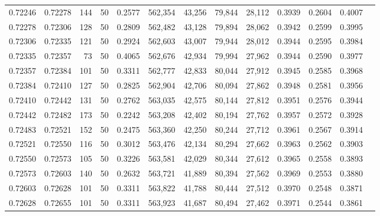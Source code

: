 \begin{tabular}{rrrrrrrrrrrrr}
0.72246 & 0.72278 &   144 &  50 &                                     0.2577 & 562,354 &  43,256 &  79,844 &  28,112 & 0.3939 & 0.2604 & 0.4007 \\
0.72278 & 0.72306 &   128 &  50 &                                     0.2809 & 562,482 &  43,128 &  79,894 &  28,062 & 0.3942 & 0.2599 & 0.3995 \\
0.72306 & 0.72335 &   121 &  50 &                                     0.2924 & 562,603 &  43,007 &  79,944 &  28,012 & 0.3944 & 0.2595 & 0.3984 \\
0.72335 & 0.72357 &    73 &  50 &                                     0.4065 & 562,676 &  42,934 &  79,994 &  27,962 & 0.3944 & 0.2590 & 0.3977 \\
0.72357 & 0.72384 &   101 &  50 &                                     0.3311 & 562,777 &  42,833 &  80,044 &  27,912 & 0.3945 & 0.2585 & 0.3968 \\
0.72384 & 0.72410 &   127 &  50 &                                     0.2825 & 562,904 &  42,706 &  80,094 &  27,862 & 0.3948 & 0.2581 & 0.3956 \\
0.72410 & 0.72442 &   131 &  50 &                                     0.2762 & 563,035 &  42,575 &  80,144 &  27,812 & 0.3951 & 0.2576 & 0.3944 \\
0.72442 & 0.72482 &   173 &  50 &                                     0.2242 & 563,208 &  42,402 &  80,194 &  27,762 & 0.3957 & 0.2572 & 0.3928 \\
0.72483 & 0.72521 &   152 &  50 &                                     0.2475 & 563,360 &  42,250 &  80,244 &  27,712 & 0.3961 & 0.2567 & 0.3914 \\
0.72521 & 0.72550 &   116 &  50 &                                     0.3012 & 563,476 &  42,134 &  80,294 &  27,662 & 0.3963 & 0.2562 & 0.3903 \\
0.72550 & 0.72573 &   105 &  50 &                                     0.3226 & 563,581 &  42,029 &  80,344 &  27,612 & 0.3965 & 0.2558 & 0.3893 \\
0.72573 & 0.72603 &   140 &  50 &                                     0.2632 & 563,721 &  41,889 &  80,394 &  27,562 & 0.3969 & 0.2553 & 0.3880 \\
0.72603 & 0.72628 &   101 &  50 &                                     0.3311 & 563,822 &  41,788 &  80,444 &  27,512 & 0.3970 & 0.2548 & 0.3871 \\
0.72628 & 0.72655 &   101 &  50 &                                     0.3311 & 563,923 &  41,687 &  80,494 &  27,462 & 0.3971 & 0.2544 & 0.3861 \\

\end{tabular}
